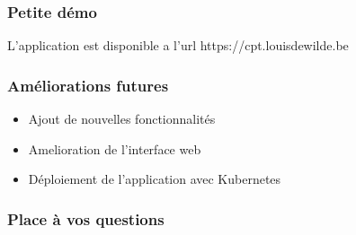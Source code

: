 \documentclass[aspectratio=169]{beamer}
\begin{document}
    \begin{frame}
        \frametitle{Petite démo}
        L'application est disponible a l'url https://cpt.louisdewilde.be
    \end{frame}

    \begin{frame}
        \frametitle{Améliorations futures}
        \begin{itemize}
            \item Ajout de nouvelles fonctionnalités
            \item Amelioration de l'interface web
            \item Déploiement de l'application avec Kubernetes
        \end{itemize}
    \end{frame}

    \begin{frame}
        \centering
        \frametitle{Place à vos questions}
    \end{frame}
\end{document}
